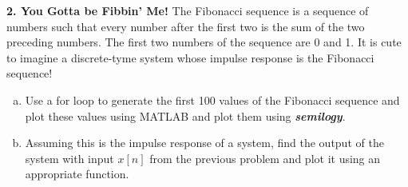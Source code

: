 \documentclass[11pt]{article}
\begin{document}
\noindent
\newline
\textbf{2. You Gotta be Fibbin' Me!}
The Fibonacci sequence is a sequence of numbers such that every number after the first two
is the sum of the two preceding numbers. The first two numbers of the sequence are 0 and 1.
It is cute to imagine a discrete-tyme system whose impulse response is the Fibonacci sequence!

\begin{enumerate}[a.]
    \item Use a for loop to generate the first 100 values of the Fibonacci sequence and plot 
    these values using MATLAB and plot them using \textit{\textbf{semilogy}}.

    \item Assuming this is the impulse response of a system,
    find the output of the system with input $x[n]$ from the previous problem and plot it 
    using an appropriate function.
\end{enumerate}
\end{document}
